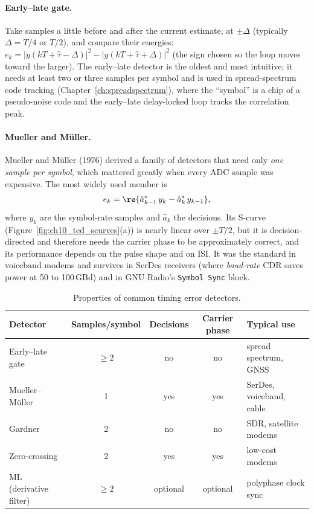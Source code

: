 \paragraph{Early--late gate.} Take samples a little before and after the current estimate, at
$\pm\Delta$ (typically $\Delta=T/4$ or $T/2$), and compare their energies:
$e_k=|y(kT+\hat\tau-\Delta)|^2-|y(kT+\hat\tau+\Delta)|^2$ (the sign chosen so the loop moves toward the
larger). The early--late detector is the oldest and most intuitive; it needs at least two or three
samples per symbol and is used in spread-spectrum code tracking (Chapter~\ref{ch:spreadspectrum}),
where the ``symbol'' is a chip of a pseudo-noise code and the early--late delay-locked loop tracks the
correlation peak.

\paragraph{Mueller and M\"uller.} Mueller and M\"uller (1976) derived a family of detectors that
need only \emph{one sample per symbol}, which mattered greatly when every ADC sample was expensive.
The most widely used member is
\begin{equation}
e_k=\re\{\hat a_{k-1}^*\,y_k-\hat a_k^*\,y_{k-1}\},
\end{equation}
where $y_k$ are the symbol-rate samples and $\hat a_k$ the decisions. Its S-curve
(Figure~\ref{fig:ch10_ted_scurves}(a)) is nearly linear over $\pm T/2$, but it is decision-directed and
therefore needs the carrier phase to be approximately correct, and its performance depends on the
pulse shape and on ISI. It was the standard in voiceband modems and survives in SerDes receivers
(where \emph{baud-rate} CDR saves power at 50 to 100\,GBd) and in GNU Radio's \texttt{Symbol Sync}
block.

\begin{table}[!htb]\centering\small
\caption{Properties of common timing error detectors.}
\label{tab:ch10:ted}
\begin{tabular}{lcccl}
\toprule
Detector & Samples/symbol & Decisions & Carrier phase & Typical use \\
\midrule
Early--late gate & $\ge2$ & no & no & spread spectrum, GNSS \\
Mueller--M\"uller & 1 & yes & yes & SerDes, voiceband, cable \\
Gardner & 2 & no & no & SDR, satellite modems \\
Zero-crossing & 2 & yes & yes & low-cost modems \\
ML (derivative filter) & $\ge2$ & optional & optional & polyphase clock sync \\
\bottomrule
\end{tabular}
\end{table}

